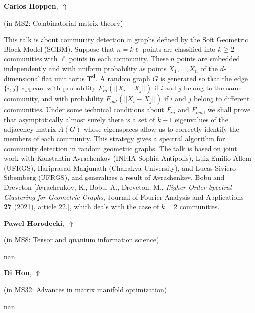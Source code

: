 \documentclass[ILAS2025-program.tex]{subfiles}
\begin{document}
     \hypertarget{down0296}{}\begin{ilasabstract}
    
    \textbf{Carlos Hoppen},  \hfill \hyperlink{up0296}{$\Uparrow$}
    
    (in {\color{mstitle}MS2: Combinatorial matrix theory})
        
        \mtskip
    This talk is about community detection in graphs defined by the Soft Geometric Block Model (SGBM). Suppose that $n=k \ell$ points are classified into $k \geq 2$ communities with $\ell$ points in each community. These $n$ points are embedded independently and with uniform probability as points $X_1,\ldots,X_n$ of the $d$-dimensional flat unit torus $\mathbf{T^d}$. A random graph $G$ is generated so that the edge $\{i,j\}$ appears with probability $F_{in}(||X_i-X_j||)$ if $i$ and $j$ belong to the same community, and with probability $F_{out}(||X_i-X_j||)$  if $i$ and $j$ belong to different communities. Under some technical conditions about $F_{in}$ and $F_{out}$, we shall prove that asymptotically almost surely there is a set of $k-1$ eigenvalues of the adjacency matrix $A(G)$ whose eigenspaces allow us to correctly identify the members of each community. This strategy gives a spectral algorithm for community detection in random geometric graphs. The talk is based on joint work with Konstantin Avrachenkov (INRIA-Sophia Antipolis), Luiz Emilio Allem (UFRGS), Hariprasad Manjunath (Chanakya University), and Lucas Siviero Sibemberg (UFRGS), and generalizes a result of Avrachenkov, Bobu and Dreveton [Avrachenkov, K., Bobu, A., Dreveton, M., \emph{Higher-Order Spectral Clustering for Geometric Graphs}, Journal of Fourier Analysis and Applications {\bf 27} (2021), article 22.], which deals with the case of $k=2$ communities. 
\end{ilasabstract}
     \hypertarget{down0252}{}\begin{ilasabstract}
    
    \textbf{Pawel Horodecki},  \hfill \hyperlink{up0252}{$\Uparrow$}
    
    (in {\color{mstitle}MS8: Tensor and quantum information science})
        
        \mtskip
    nan\end{ilasabstract}
     \hypertarget{down0187}{}\begin{ilasabstract}
    
    \textbf{Di Hou},  \hfill \hyperlink{up0187}{$\Uparrow$}
    
    (in {\color{mstitle}MS32: Advances in matrix manifold optimization})
        
        \mtskip
    nan\end{ilasabstract}
\end{document}
